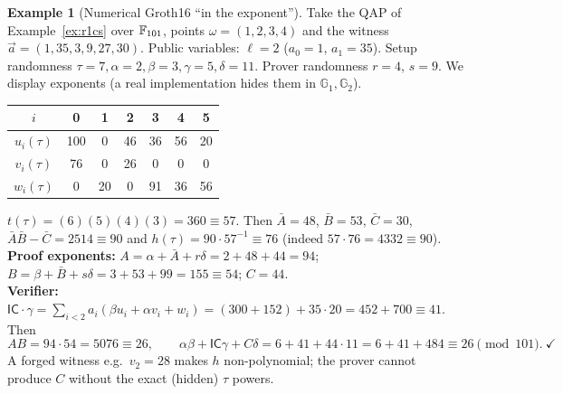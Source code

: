 \documentclass[11pt,a4paper]{report}
\theoremstyle{plain}
\theoremstyle{definition}
\newtheorem{example}[theorem]{Example}
\theoremstyle{remark}
\newcommand{\GG}{\mathbb{G}}
\begin{document}
\begin{example}[Numerical Groth16 ``in the exponent'']\label{ex:groth16}
Take the QAP of Example~\ref{ex:r1cs} over $\mathbb{F}_{101}$, points $\omega=(1,2,3,4)$ and the witness $\vec a=(1,35,3,9,27,30)$. Public variables: $\ell=2$ ($a_0=1$, $a_1=35$). Setup randomness $\tau=7,\alpha=2,\beta=3,\gamma=5,\delta=11$. Prover randomness $r=4$, $s=9$. We display exponents (a real implementation hides them in $\GG_1,\GG_2$).
\begin{center}\small
\begin{tabular}{c|cccccc}
$i$ & 0 & 1 & 2 & 3 & 4 & 5\\\hline
$u_i(\tau)$ & 100 & 0 & 46 & 36 & 56 & 20\\
$v_i(\tau)$ & 76 & 0 & 26 & 0 & 0 & 0\\
$w_i(\tau)$ & 0 & 20 & 0 & 91 & 36 & 56
\end{tabular}
\end{center}
$t(\tau)=(6)(5)(4)(3)=360\equiv57$. Then $\bar A=48$, $\bar B=53$, $\bar C=30$, $\bar A\bar B-\bar C=2514\equiv90$ and $h(\tau)=90\cdot57^{-1}\equiv76$ (indeed $57\cdot76=4332\equiv90$).\\
\textbf{Proof exponents:} $A=\alpha+\bar A+r\delta=2+48+44=94$; $B=\beta+\bar B+s\delta=3+53+99=155\equiv54$; $C=44$.\\
\textbf{Verifier:} $\mathsf{IC}\cdot\gamma=\sum_{i<2}a_i(\beta u_i+\alpha v_i+w_i)=(300+152)+35\cdot20=452+700\equiv41$. Then
\[AB=94\cdot54=5076\equiv26,\qquad \alpha\beta+\mathsf{IC}\gamma+C\delta=6+41+44\cdot11=6+41+484\equiv26\pmod{101}.\ \checkmark\]
A forged witness e.g.\ $v_2=28$ makes $h$ non-polynomial; the prover cannot produce $C$ without the exact (hidden) $\tau$ powers.
\end{example}
\end{document}
